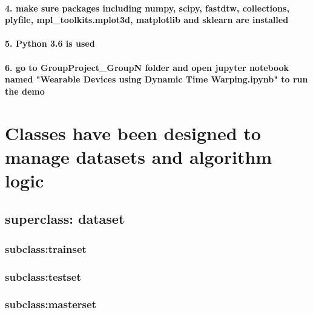 \documentclass[11pt]{article}
\begin{document}
\paragraph{4. make sure packages including numpy, scipy, fastdtw,
collections, plyfile, mpl\_toolkits.mplot3d, matplotlib and sklearn are
installed}\label{make-sure-packages-including-numpy-scipy-fastdtw-collections-plyfile-mpl_toolkits.mplot3d-matplotlib-and-sklearn-are-installed}

\paragraph{5. Python 3.6 is used}\label{python-3.6-is-used}

\paragraph{6. go to GroupProject\_GroupN folder and open jupyter
notebook named "Wearable Devices using Dynamic Time Warping.ipynb" to
run the
demo}\label{go-to-groupproject_groupn-folder-and-open-jupyter-notebook-named-wearable-devices-using-dynamic-time-warping.ipynb-to-run-the-demo}

    \section{Classes have been designed to manage datasets and algorithm
logic}\label{classes-have-been-designed-to-manage-datasets-and-algorithm-logic}

\subsection{superclass: dataset}\label{superclass-dataset}

\subsubsection{subclass:trainset}\label{subclasstrainset}

\subsubsection{subclass:testset}\label{subclasstestset}

\subsubsection{subclass:masterset}\label{subclassmasterset}
\end{document}
